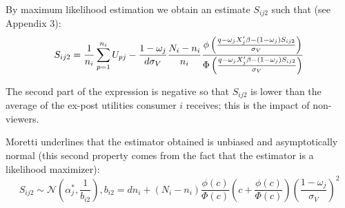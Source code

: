	By maximum likelihood estimation we obtain an estimate $S_{i j 2}$ such that (see Appendix 3):
	\begin{equation}
	S_{i j 2}=\frac{1}{n_{i}}\sum_{p=1}^{n_{i}}U_{p j}-\frac{1-\omega_{j}}{d\sigma_{V}}\frac{N_{i}-n_{i}}{n_{i}}\frac{\phi\left(\frac{q-\omega_{j}X'_{j}\beta-(1-\omega_{j})S_{i j 2}}{\sigma_{V}}\right)}{\Phi\left(\frac{q-\omega_{j}X'_{j}\beta-(1-\omega_{j})S_{i j 2}}{\sigma_{V}}\right)}\\
	\end{equation}
	
	The second part of the expression is negative so that $S_{i j 2}$ is lower than the average of the ex-post utilities consumer $i$ receives; this is the impact of non-viewers.
	
	Moretti underlines that the estimator obtained is unbiased and asymptotically normal (this second property comes from the fact that the estimator is a likelihood maximizer): 
	\begin{equation}
	S_{i j 2}\sim\mathcal{N}(\alpha_{j}^{*}, \frac{1}{b_{i 2}}) , b_{i 2}=dn_{i}+(N_{i}-n_{i})\frac{\phi(c)}{\Phi(c)}\left(c+\frac{\phi(c)}{\Phi(c)}\right)\left(\frac{1-\omega_{j}}{\sigma_{V}}\right)^{2}
	\end{equation}\\
	
